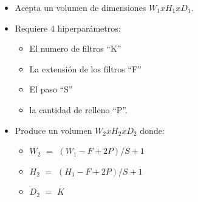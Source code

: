 \begin{itemize}
    \item Acepta un volumen de dimensiones $W_{1}xH_{1}xD_{1}$.
    \item Requiere 4 hiperparámetros:
    \begin{itemize}
        \item El numero de filtros ``K''
        \item La extensión de los filtros ``F''
        \item El paso ``S''
        \item la cantidad de relleno ``P''.
    \end{itemize}
    \item Produce un volumen $W_{2}xH_{2}xD_{2}$ donde:
    \begin{itemize}
        \item $W_{2}$ $=$ $(W_{1} - F + 2P)/S+1$
        \item $H_{2}$ $=$ $(H_{1} - F + 2P)/S+1$
        \item $D_{2}$ $=$ $K$
    \end{itemize}
\end{itemize}
